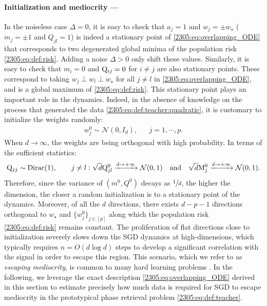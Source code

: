 \paragraph{Initialization and mediocrity ---} In the noiseless case $\Delta=0$, it is easy to check that $a_{j}=1$ and $w_{j}=\pm w_{\star}$ ($m_{j}=\pm 1$ and $Q_{jl} = 1$) is indeed a stationary point of \eqref{2305:eq:overlapping_ODE} that corresponds to two degenerated global minima of the population risk \eqref{2305:eq:def:risk}. Adding a noise $\Delta>0$ only shift these values. Similarly, it is easy to check that $m_{i}=0$ and $\mathrm{Q}_{ij}=0$ for $i\neq j$ are also stationary points. These correspond to taking $w_{j}\perp w_{l} \perp w_{\star}$ for all $j\neq l$ in \eqref{2305:eq:overlapping_ODE}, and is a global maximum of \eqref{2305:eq:def:risk}. This stationary point plays an important role in the dynamics. Indeed, in the absence of knowledge on the process that generated the data \eqref{2305:eq:def:teacher:quadratic}, it is customary to initialize the weights randomly:
\begin{align}\label{2305:eq:initial_conditions_unconstrainted}
    w^{0}_{j}\sim \mathcal{N}(0,I_{d}), && j=1,\cdots, p.
\end{align}
When $d\to\infty$, the weights are being orthogonal with high probability. In terms of the sufficient statistics: 
\begin{equation}\label{2305:eq:initial_distribution_QM}
    \mathrm{Q}_{jj} \sim \text{Dirac}(1), \qquad
    j\neq l: 
    \sqrt{d} \mathrm{Q}^{0}_{jl} \xrightarrow{d\to+\infty} \mathcal{N}(0,1)
    \quad\text{and}\quad
    \sqrt{d} \mathrm{M}^{0}_{j} \xrightarrow{d\to+\infty} \mathcal{N}(0,1).
\end{equation}
Therefore, since the variance of $(m^{0},Q^{0})$ decays as $\sfrac{1}{d}$, the higher the dimension, the closer a random initialization is to a stationary point of the dynamics. Moreover, of all the $d$ directions, there exists $d-p-1$ directions orthogonal to $w_{\star}$ and $\{w^{0}_{j}\}_{j\in[p]}$ along which the population risk \eqref{2305:eq:def:risk} remains constant. The proliferation of flat directions close to initialization severely slows down the SGD dynamics at high-dimensions, which typically requires $n=O(d\log{d})$ steps to develop a significant correlation with the signal in order to escape this region. This scenario, which we refer to as \emph{escaping mediocrity}, is common to many hard learning problems \citep{arous2021online}. In the following, we leverage the exact description \eqref{2305:eq:overlapping_ODE} derived in this section to estimate precisely how much data is required for SGD to escape mediocrity in the prototypical phase retrieval problem \eqref{2305:eq:def:teacher}. 

